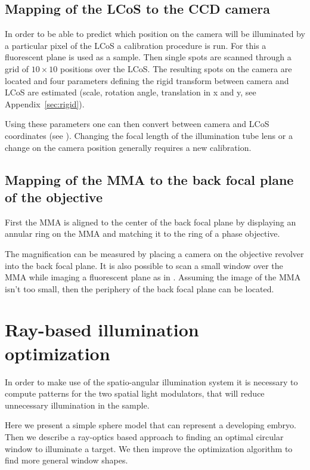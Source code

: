 \subsection{Mapping of the LCoS to the CCD camera}

In order to be able to predict which position on the camera will be
illuminated by a particular pixel of the LCoS a calibration procedure
is run. For this a fluorescent plane is used as a sample. Then single
spots are scanned through a grid of $10\times10$ positions over the
LCoS. The resulting spots on the camera are located and four
parameters defining the rigid transform between camera and LCoS are
estimated (scale, rotation angle, translation in x and y, see
Appendix~\ref{sec:rigid}).

Using these parameters one can then convert between camera and LCoS
coordinates (see ). Changing the focal
length of the illumination tube lens or a change on the camera position
generally requires a new calibration.


\subsection{Mapping of the MMA to the back focal plane of the
  objective}
First the MMA is aligned to the center of the back focal plane by
displaying an annular ring on the MMA and matching it to the ring of a
phase objective. 

The magnification can be measured by placing a camera on the objective
revolver into the back focal plane. It is also possible to scan a
small window over the MMA while imaging a fluorescent plane as in
. Assuming the image of the MMA isn't
too small, then the periphery of the back focal plane can be located.


\section{Ray-based illumination optimization}
\begin{summary}
  In order to make use of the spatio-angular illumination system it is
  necessary to compute patterns for the two spatial light modulators,
  that will reduce unnecessary illumination in the sample.

  Here we present a simple sphere model that can represent a
  developing embryo. Then we describe a ray-optics based approach to
  finding an optimal circular window to illuminate a target. We then
  improve the optimization algorithm to find more general window
  shapes.
\end{summary}

